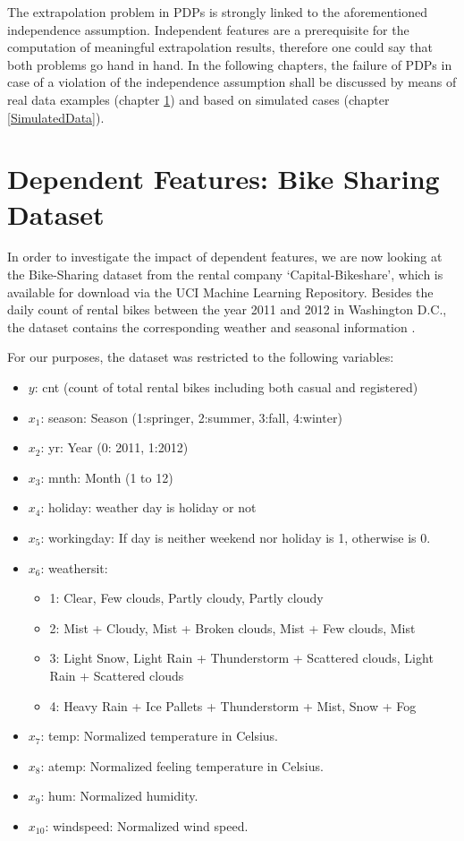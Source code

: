 \documentclass[]{krantz}
\providecommand{\tightlist}{%
  \setlength{\itemsep}{0pt}\setlength{\parskip}{0pt}}
\begin{document}
The extrapolation problem in PDPs is strongly linked to the
aforementioned independence assumption. Independent features are a
prerequisite for the computation of meaningful extrapolation results,
therefore one could say that both problems go hand in hand. In the
following chapters, the failure of PDPs in case of a violation of the
independence assumption shall be discussed by means of real data
examples (chapter \ref{RealData}) and based on simulated cases (chapter
\ref{SimulatedData}).

\section{Dependent Features: Bike Sharing Dataset}\label{RealData}

In order to investigate the impact of dependent features, we are now
looking at the Bike-Sharing dataset from the rental company
`Capital-Bikeshare', which is available for download via the UCI Machine
Learning Repository. Besides the daily count of rental bikes between the
year 2011 and 2012 in Washington D.C., the dataset contains the
corresponding weather and seasonal information \citep{Fanaee-T}.

For our purposes, the dataset was restricted to the following variables:

\begin{itemize}
\tightlist
\item
  \(y\): cnt (count of total rental bikes including both casual and
  registered)
\item
  \(x_1\): season: Season (1:springer, 2:summer, 3:fall, 4:winter)
\item
  \(x_2\): yr: Year (0: 2011, 1:2012)
\item
  \(x_3\): mnth: Month (1 to 12)
\item
  \(x_4\): holiday: weather day is holiday or not
\item
  \(x_5\): workingday: If day is neither weekend nor holiday is 1,
  otherwise is 0.
\item
  \(x_6\): weathersit:

  \begin{itemize}
  \tightlist
  \item
    1: Clear, Few clouds, Partly cloudy, Partly cloudy
  \item
    2: Mist + Cloudy, Mist + Broken clouds, Mist + Few clouds, Mist
  \item
    3: Light Snow, Light Rain + Thunderstorm + Scattered clouds, Light
    Rain + Scattered clouds
  \item
    4: Heavy Rain + Ice Pallets + Thunderstorm + Mist, Snow + Fog
  \end{itemize}
\item
  \(x_7\): temp: Normalized temperature in Celsius.
\item
  \(x_8\): atemp: Normalized feeling temperature in Celsius.
\item
  \(x_9\): hum: Normalized humidity.
\item
  \(x_{10}\): windspeed: Normalized wind speed.
\end{itemize}
\end{document}
